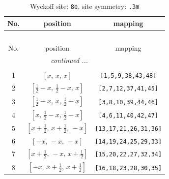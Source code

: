 \documentclass[fleqn,8pt]{jsarticle}
\begin{document}
\renewcommand{\arraystretch}{1.2}
\begin{longtable}{ccc}
\caption{Wyckoff site: {\tt 8e}, site symmetry: {\tt .3m}}
 \\
 \hline \hline
No. & position & mapping \\ \hline \endfirsthead

\multicolumn{2}{l}{\tablename\ \thetable{}} \\
 \hline \hline
No. & position & mapping \\ \hline \endhead

 \hline \hline
\multicolumn{2}{r}{\footnotesize\it continued ...} \\ \endfoot

 \hline \hline
\multicolumn{2}{r}{} \\ \endlastfoot

1 & $\left[ x,\, x,\, x \right]$ & {\tt [1,5,9,38,43,48]} \\ \hline
2 & $\left[ \frac{1}{2} - x,\, \frac{1}{2} - x,\, x \right]$ & {\tt [2,7,12,37,41,45]} \\ \hline
3 & $\left[ \frac{1}{2} - x,\, x,\, \frac{1}{2} - x \right]$ & {\tt [3,8,10,39,44,46]} \\ \hline
4 & $\left[ x,\, \frac{1}{2} - x,\, \frac{1}{2} - x \right]$ & {\tt [4,6,11,40,42,47]} \\ \hline
5 & $\left[ x + \frac{1}{2},\, x + \frac{1}{2},\, - x \right]$ & {\tt [13,17,21,26,31,36]} \\ \hline
6 & $\left[ - x,\, - x,\, - x \right]$ & {\tt [14,19,24,25,29,33]} \\ \hline
7 & $\left[ x + \frac{1}{2},\, - x,\, x + \frac{1}{2} \right]$ & {\tt [15,20,22,27,32,34]} \\ \hline
8 & $\left[ - x,\, x + \frac{1}{2},\, x + \frac{1}{2} \right]$ & {\tt [16,18,23,28,30,35]} \\
\end{longtable}
\renewcommand{\arraystretch}{1.2}
\end{document}
